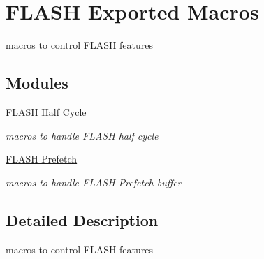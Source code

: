 \hypertarget{group___f_l_a_s_h___exported___macros}{}\section{F\+L\+A\+SH Exported Macros}
\label{group___f_l_a_s_h___exported___macros}


macros to control F\+L\+A\+SH features  


\subsection*{Modules}
\begin{DoxyCompactItemize}
\item 
\hyperlink{group___f_l_a_s_h___half___cycle}{F\+L\+A\+S\+H Half Cycle}
\begin{DoxyCompactList}\small\item\em macros to handle F\+L\+A\+SH half cycle \end{DoxyCompactList}\item 
\hyperlink{group___f_l_a_s_h___prefetch}{F\+L\+A\+S\+H Prefetch}
\begin{DoxyCompactList}\small\item\em macros to handle F\+L\+A\+SH Prefetch buffer \end{DoxyCompactList}\end{DoxyCompactItemize}


\subsection{Detailed Description}
macros to control F\+L\+A\+SH features 

